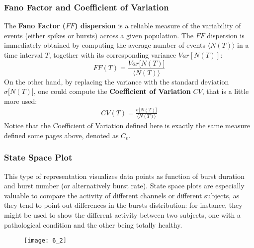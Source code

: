 \subsubsection{Fano Factor and Coefficient of Variation}
The \textbf{Fano Factor (\(FF\)) dispersion} is a reliable measure of the variability of events
(either spikes or bursts) across a given population. The \(FF\) dispersion is
immediately obtained by computing the average number of events \(\langle{N(T)}\rangle\)
in a time interval \(T\), together with its corresponding variance
\(Var[N(T)]\):
\begin{equation*}
    FF(T)=\frac{Var\bigl[N(T)\bigr]}{\langle{N(T)}\rangle}
\end{equation*}
On the other hand, by replacing the variance with the standard deviation
\(\sigma\bigl[N(T)\bigr]\), one could compute the \textbf{Coefficient of Variation}
\(CV\), that is a little more used:
\begin{align*}
    CV(T)=\frac{\sigma\bigl[N(T)\bigr]}{\langle{N(T)}\rangle}
\end{align*}
Notice that the Coefficient of Variation defined here is exactly the same
measure defined some pages above, denoted as \(C_v\).
\subsubsection{State Space Plot}
This type of representation visualizes data points as function of burst duration
and burst number (or alternatively burst rate). State space plots are
especially valuable to compare the activity of different channels or different
subjects, as they tend to point out differences in the bursts distribution:
for instance, they might be used to show the different activity between two
subjects, one with a pathological condition and the other being totally healthy.
\begin{figure}[H]
    \texttt{[image: 6\_2]}
    \centering
\end{figure}
